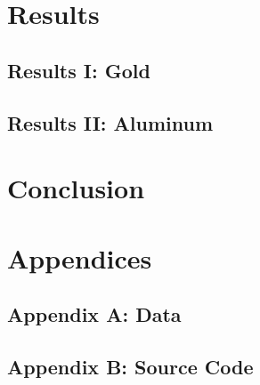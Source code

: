 \documentclass[a4paper]{article}
\begin{document}
\qq 

\qq 

\section{Results}

\subsection{Results I: Gold}

\qq 

\qq 

\qq

\subsection{Results II: Aluminum}

\qq 

\qq 

\qq

\section{Conclusion}

\qq 

\qq 

\section{Appendices}

\subsection{Appendix A: Data}

\subsection{Appendix B: Source Code}
\end{document}

